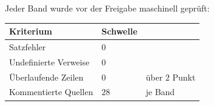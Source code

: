 \begin{merksatz}
Jeder Band wurde vor der Freigabe maschinell geprüft:

\begin{center}
{\small
\renewcommand{\arraystretch}{1.48}
\begin{tabular}{@{}P{3.2cm}P{2.0cm}P{2.6cm}@{}}
\toprule
\textbf{Kriterium} & \textbf{Schwelle} & \\
\midrule
Satzfehler & $0$ & \\
Undefinierte Verweise & $0$ & \\
Überlaufende Zeilen & $0$ & über $2$ Punkt\\
Kommentierte Quellen & $28$ & je Band\\
\bottomrule
\end{tabular}}
\end{center}

\begin{center}
\begin{minipage}{0.88\textwidth}
\end{minipage}
\end{center}
\end{merksatz}
